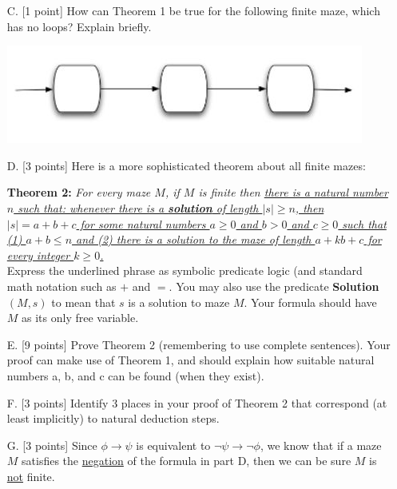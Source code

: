 \documentclass[12pt,letterpaper,boxed,cm]{hmcpset}
\newcommand{\abs}[1]{\left| #1 \right|}
\newcommand{\ra}[0]{\rightarrow}
\begin{document}
\newpage
\begin{problem} [2. cont.]
    \begin{enumerate}
        \item [C.] [1 point] How can Theorem 1 be true for the following finite maze, which has no loops? Explain briefly.
        \begin{center}
            \includegraphics{02.JPG}
        \end{center}
        \item [D.] [3 points] Here is a more sophisticated theorem about all finite mazes:

        \textbf{Theorem 2:} \emph{For every maze $M$, if $M$ is finite then \ul{there is a natural number $n$ such that: whenever there is a \textbf{solution} of length $\abs{s} ≥ n$, then $\abs{s} = a + b + c$ for some natural numbers $a\ge0$ and $b>0$ and $c \ge 0$ such that (1) $a+b \le n$ and (2) there is a solution to the maze of length $a + kb + c$ for every integer $k \ge 0$.}}\\

        Express the underlined phrase as symbolic predicate logic (and standard math notation such as $+$ and $=$. You may also use the predicate \textbf{Solution}$(M,s)$ to mean that $s$ is a solution to maze $M$. Your formula should have $M$ as its only free variable.
        \item [E.] [9 points] Prove Theorem 2 (remembering to use complete sentences). Your proof can make use of Theorem 1, and should explain how suitable natural numbers a, b, and c can be found (when they exist).
        \item [F.] [3 points] Identify 3 places in your proof of Theorem 2 that correspond (at least implicitly) to natural deduction steps.
        \item [G.] [3 points] Since $\phi \ra \psi$ is equivalent to $\neg\psi\ra\neg\phi$, we know that if a maze $M$ satisfies the \ul{negation} of the formula in part D, then we can be sure $M$ is \ul{not} finite. 


\end{enumerate}
\end{problem}
\end{document}
